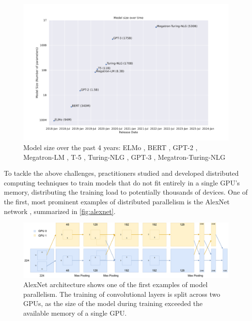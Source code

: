 \begin{figure}[h]
    \caption{Model size over the past 4 years: ELMo \cite{peters2018elmo}, BERT \cite{devlin2018bert}, GPT-2 \cite{radford2019language}, Megatron-LM \cite{shoeybi2019megatronlm}, T-5 \cite{raffael2019t5}, Turing-NLG \cite{microsoft2020turingnlg}, GPT-3 \cite{brown2020gpt3}, Megatron-Turing-NLG \cite{smith2022megatronturingnlg}}
    \label{fig:model-size-over-time}
    \includegraphics[width=\textwidth]{./figures/model-size-over-time.pdf}
\end{figure}

To tackle the above challenges, practitioners studied and developed distributed computing techniques to train models that do not fit entirely in a single GPU's memory, distributing the training load to potentially thousands of devices.
One of the first, most prominent examples of distributed parallelism is the AlexNet network \cite{alexnet2012}, summarized in \autoref{fig:alexnet}.

\begin{figure}[h]
    \caption{AlexNet \cite{alexnet2012} architecture shows one of the first examples of model parallelism. The training of convolutional layers is split across two GPUs, as the size of the model during training exceeded the available memory of a single GPU.}
    \label{fig:alexnet}
    \includegraphics[width=\textwidth]{./figures/alexnet.pdf}
\end{figure}

